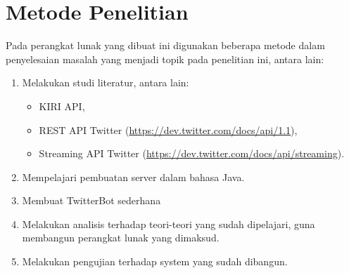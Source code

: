 \section{Metode Penelitian}
Pada perangkat lunak yang dibuat ini digunakan beberapa metode dalam penyelesaian masalah yang menjadi topik pada penelitian ini, antara lain:
\begin{enumerate}
	\item Melakukan studi literatur, antara lain:
	\begin{itemize}
		\item KIRI API,
		\item REST API Twitter (\url{https://dev.twitter.com/docs/api/1.1}),
		\item Streaming API Twitter (\url{https://dev.twitter.com/docs/api/streaming}).
	\end{itemize}
	\item Mempelajari pembuatan server dalam bahasa Java.
	\item Membuat TwitterBot sederhana
	\item Melakukan analisis terhadap teori-teori yang sudah dipelajari, guna membangun perangkat lunak yang dimaksud.
	\item Melakukan pengujian terhadap system yang sudah dibangun.
\end{enumerate}
